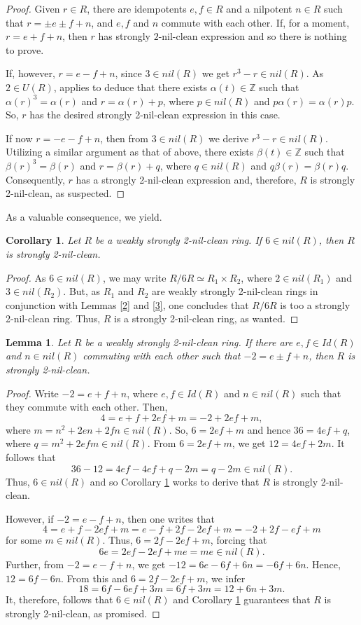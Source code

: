 \documentclass[12pt]{amsart}
\newtheorem{lemma}[theorem]{Lemma}
\newtheorem{corollary}[theorem]{Corollary}
\theoremstyle{definition}
\begin{document}
\begin{proof} Given $r\in R$, there are idempotents $e,f\in R$ and a nilpotent $n\in R$ such that $r=\pm e\pm f+n$, and $e,f$ and $n$ commute with each other. If, for a moment, $r=e+f+n$, then $r$ has strongly $2$-nil-clean expression and so there is nothing to prove.

If, however, $r=e-f+n$, since $3\in nil(R)$ we get $r^3-r\in nil(R)$. As $2\in U(R)$, \cite[Lemma 2.6]{zhou} applies to deduce that there exists $\alpha(t)\in \mathbb{Z}$ such that $\alpha(r)^3=\alpha(r)$ and $r=\alpha(r)+p$, where $p\in nil(R)$ and $p\alpha(r)=\alpha(r)p$. So, $r$ has the desired strongly 2-nil-clean expression in this case.

If now $r=-e-f+n$, then from $3\in nil(R)$ we derive $r^3-r\in nil(R)$. Utilizing a similar argument as that of above, there exists $\beta(t)\in \mathbb{Z}$ such that $\beta(r)^3=\beta(r)$ and $r=\beta(r)+q$, where $q\in nil(R)$ and $q\beta(r)=\beta(r)q$. Consequently, $r$ has a strongly 2-nil-clean expression and, therefore, $R$ is strongly 2-nil-clean, as suspected.
\end{proof}

As a valuable consequence, we yield.

\begin{corollary}\label{4} Let $R$ be a weakly strongly 2-nil-clean ring. If $6\in nil(R)$, then $R$ is strongly 2-nil-clean.
\end{corollary}

\begin{proof} As $6\in nil(R)$, we may write $R/6R\simeq R_1\times R_2$, where $2\in nil(R_1)$ and $3\in nil(R_2)$. But, as $R_1$ and $R_2$ are weakly strongly 2-nil-clean rings in conjunction with Lemmas \ref{2} and \ref{3}, one concludes that $R/6R$ is too a strongly 2-nil-clean ring. Thus, $R$ is a strongly 2-nil-clean ring, as wanted.
\end{proof}

\begin{lemma}\label{5} Let $R$ be a weakly strongly 2-nil-clean ring. If there are $e,f\in Id(R)$ and $n\in nil(R)$ commuting with each other such that  $-2=e\pm f+n$, then $R$ is strongly 2-nil-clean.
\end{lemma}

\begin{proof} Write $-2=e+f+n$, where $e,f\in Id(R)$ and $n\in nil(R)$ such that they commute with each other. Then, $$4=e+f+2ef+m=-2+2ef+m,$$ where $m=n^2+2en+2fn\in nil(R)$. So, $6=2ef+m$ and hence $36=4ef+q$, where $q=m^2+2efm\in nil(R)$. From $6=2ef+m$, we get $12=4ef+2m$. It follows that $$36-12=4ef-4ef+q-2m=q-2m\in nil(R).$$ Thus, $6\in nil(R)$ and so Corollary \ref{4} works to derive that $R$ is strongly 2-nil-clean.

However, if $-2=e-f+n$, then one writes that $$4=e+f-2ef+m=e-f+2f-2ef+m=-2+2f-ef+m$$ for some $m\in nil(R)$. Thus, $6=2f-2ef+m$, forcing that $$6e=2ef-2ef+me=me\in nil(R).$$ Further, from $-2=e-f+n$, we get $-12=6e-6f+6n=-6f+6n$. Hence, $12=6f-6n$. From this and $6=2f-2ef+m$, we infer $$18=6f-6ef+3m=6f+3m=12+6n+3m.$$ It, therefore, follows that $6\in nil(R)$ and Corollary \ref{4} guarantees that $R$ is strongly 2-nil-clean, as promised.
\end{proof}
\end{document}
